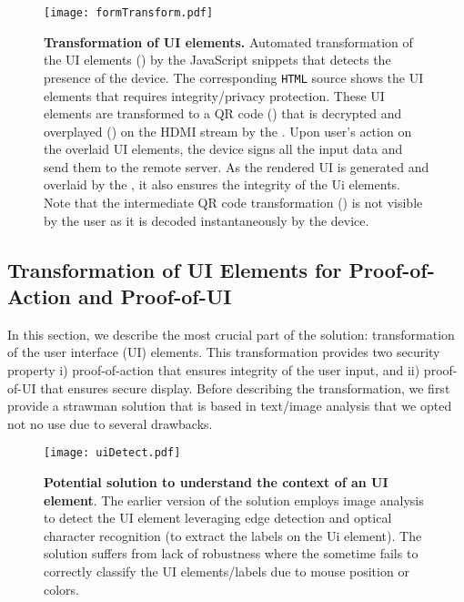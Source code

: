 \begin{figure*}[t]
\centering
\texttt{[image: formTransform.pdf]}
\caption{\textbf{Transformation of UI elements.} Automated transformation of the UI elements (\one) by the \name JavaScript snippets that detects the presence of the device. The corresponding \texttt{HTML} source shows the UI elements that requires integrity/privacy protection. These UI elements are transformed to a QR code (\two) that is decrypted and overplayed (\three) on the HDMI stream by the \device. Upon user's action on the overlaid UI elements, the device signs all the input data and send them to the remote server. As the rendered UI is generated and overlaid by the \device, it also ensures the integrity of the Ui elements. Note that the intermediate QR code transformation (\two) is not visible by the user as it is decoded instantaneously by the device.}
\label{fig:transformation}
\end{figure*}


\subsection{Transformation of UI Elements for Proof-of-Action and Proof-of-UI}
\label{sec:systemDesign:transformation}


In this section, we describe the most crucial part of the \name solution: transformation of the user interface (UI) elements. This transformation provides two security property i) proof-of-action that ensures integrity of the user input, and ii) proof-of-UI that ensures secure display. Before describing the transformation, we first provide a strawman solution that is based in text/image analysis that we opted not no use due to several drawbacks.   

\begin{figure}[!htpb]
\centering
\texttt{[image: uiDetect.pdf]}
\caption{\textbf{Potential solution to understand the context of an UI element}. The earlier version of the \name solution employs image analysis to detect the UI element leveraging edge detection and optical character recognition (to extract the labels on the Ui element). The solution suffers from lack of robustness where the \device sometime fails to correctly classify the UI elements/labels due to mouse position or colors.}
\label{fig:uiDetect}
\centering
\end{figure}

